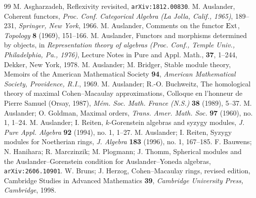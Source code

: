 \documentclass{amsart}
\theoremstyle{definition}
\theoremstyle{remark}
\numberwithin{equation}{thm}
\begin{document}
\begin{thebibliography}{99}
{\sc M. Asgharzadeh}, Reflexivity revisited, {\tt arXiv:1812.00830}.
{\sc M. Auslander}, Coherent functors, {\em Proc. Conf. Categorical Algebra (La Jolla, Calif., 1965)}, 189--231, {\em Springer, New York}, 1966.
{\sc M. Auslander}, Comments on the functor ${\rm Ext}$, {\em Topology} {\bf 8} (1969), 151--166.
{\sc M. Auslander}, Functors and morphisms determined by objects, in {\em Representation theory of algebras (Proc. Conf., Temple Univ., Philadelphia, Pa., 1976)}, Lecture Notes in Pure and Appl. Math., {\bf 37}, 1--244, Dekker, New York, 1978.
{\sc M. Auslander; M. Bridger}, Stable module theory, Memoirs of the American Mathematical Society {\bf 94}, {\em American Mathematical Society, Providence, R.I.}, 1969.
{\sc M. Auslander; R.-O. Buchweitz}, The homological theory of maximal Cohen--Macaulay approximations, Colloque en l'honneur de Pierre Samuel (Orsay, 1987), {\it M\'em. Soc. Math. France (N.S.)} {\bf 38} (1989), 5--37.
{\sc M. Auslander; O. Goldman}, Maximal orders, {\em Trans. Amer. Math. Soc.} {\bf 97} (1960), no. 1, 1--24.
{\sc M. Auslander; I. Reiten}, $k$-Gorenstein algebras and syzygy modules, {\em J. Pure Appl. Algebra} {\bf 92} (1994), no. 1, 1--27.
{\sc M. Auslander; I. Reiten}, Syzygy modules for Noetherian rings, {\em J. Algebra} {\bf 183} (1996), no. 1, 167--185.
{\sc F. Bauwens; N. Hanihara; R. Marczinzik; M. Plogmann; J. Thomm}, Spherical modules and the Auslander--Gorenstein condition for Auslander--Yoneda algebras, {\tt arXiv:2606.10901}.
{\sc W. Bruns; J. Herzog}, Cohen--Macaulay rings, revised edition, Cambridge Studies in Advanced Mathematics {\bf 39}, {\it Cambridge University Press, Cambridge}, 1998.

\end{thebibliography}
\end{document}
